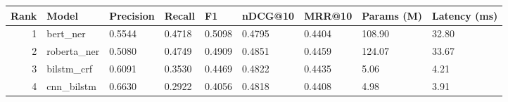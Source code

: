 \begin{tabular}{rllllllll}
\toprule
Rank & Model & Precision & Recall & F1 & nDCG@10 & MRR@10 & Params (M) & Latency (ms) \\
\midrule
1 & bert_ner & 0.5544 & 0.4718 & 0.5098 & 0.4795 & 0.4404 & 108.90 & 32.80 \\
2 & roberta_ner & 0.5080 & 0.4749 & 0.4909 & 0.4851 & 0.4459 & 124.07 & 33.67 \\
3 & bilstm_crf & 0.6091 & 0.3530 & 0.4469 & 0.4822 & 0.4435 & 5.06 & 4.21 \\
4 & cnn_bilstm & 0.6630 & 0.2922 & 0.4056 & 0.4818 & 0.4408 & 4.98 & 3.91 \\
\bottomrule
\end{tabular}
